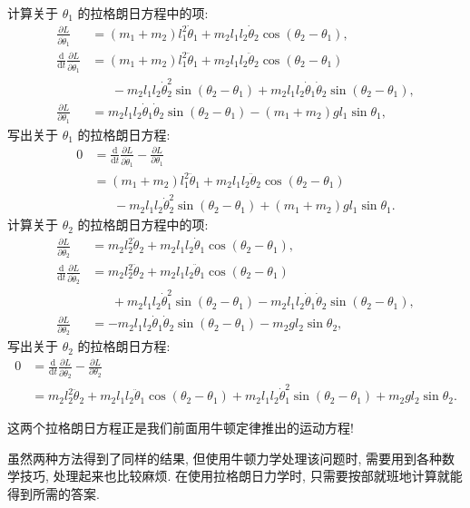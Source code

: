 \begin{example}[双摆]
    计算关于 $ \theta_1 $ 的拉格朗日方程中的项:
    \begin{align*}
        \frac{\partial L}{\partial\dot{\theta}_1} &= (m_1+m_2)l_1^2\dot{\theta}_1+m_2l_1l_2\dot{\theta}_2\cos(\theta_2-\theta_1),\\ 
        \frac{\mathrm{d}}{\mathrm{d}t}\frac{\partial L}{\partial\dot{\theta}_1} &= (m_1+m_2)l_1^2\ddot{\theta}_1+m_2l_1l_2\ddot{\theta}_2\cos(\theta_2-\theta_1)\\ 
        &\phantom{=}\;-m_2l_1l_2\dot{\theta}_2^2\sin(\theta_2-\theta_1)+m_2l_1l_2\dot{\theta}_1\dot{\theta}_2\sin(\theta_2-\theta_1),\\ 
        \frac{\partial L}{\partial\theta_1} &= m_2l_1l_2\dot{\theta}_1\dot{\theta}_2\sin(\theta_2-\theta_1)-(m_1+m_2)gl_1\sin\theta_1,
    \end{align*}
    写出关于 $ \theta_1 $ 的拉格朗日方程:
    \begin{align*}
        0 &= \frac{\mathrm{d}}{\mathrm{d}t}\frac{\partial L}{\partial\dot{\theta}_1}-\frac{\partial L}{\partial\theta_1}\\ 
        &= (m_1+m_2)l_1^2\ddot{\theta}_1+m_2l_1l_2\ddot{\theta}_2\cos(\theta_2-\theta_1)\\ 
        &\phantom{=}\;-m_2l_1l_2\dot{\theta}_2^2\sin(\theta_2-\theta_1)+(m_1+m_2)gl_1\sin\theta_1.
    \end{align*}
    计算关于 $ \theta_2 $ 的拉格朗日方程中的项:
    \begin{align*}
        \frac{\partial L}{\partial\dot{\theta_2}} &= m_2l_2^2\dot{\theta}_2+m_2l_1l_2\dot{\theta}_1\cos(\theta_2-\theta_1),\\ 
        \frac{\mathrm{d}}{\mathrm{d}t}\frac{\partial L}{\partial\dot{\theta}_2} &= m_2l_2^2\ddot{\theta}_2+m_2l_1l_2\ddot{\theta}_1\cos(\theta_2-\theta_1)\\ 
        &\phantom{=}\;+m_2l_1l_2\dot{\theta}_1^2\sin(\theta_2-\theta_1)-m_2l_1l_2\dot{\theta}_1\dot{\theta}_2\sin(\theta_2-\theta_1),\\ 
        \frac{\partial L}{\partial\theta_2} &= -m_2l_1l_2\dot{\theta}_1\dot{\theta}_2\sin(\theta_2-\theta_1)-m_2gl_2\sin\theta_2,
    \end{align*}
    写出关于 $ \theta_2 $ 的拉格朗日方程:
    \begin{align*}
        0 &= \frac{\mathrm{d}}{\mathrm{d}t}\frac{\partial L}{\partial\dot{\theta_2}}-\frac{\partial L}{\partial\theta_2}\\ 
        &= m_2l_2^2\ddot{\theta}_2+m_2l_1l_2\ddot{\theta}_1\cos(\theta_2-\theta_1)+m_2l_1l_2\dot{\theta}_1^2\sin(\theta_2-\theta_1)+m_2gl_2\sin\theta_2.
    \end{align*}

    这两个拉格朗日方程正是我们前面用牛顿定律推出的运动方程!
\end{example}
虽然两种方法得到了同样的结果, 但使用牛顿力学处理该问题时, 需要用到各种数学技巧, 处理起来也比较麻烦. 在使用拉格朗日力学时, 只需要按部就班地计算就能得到所需的答案.